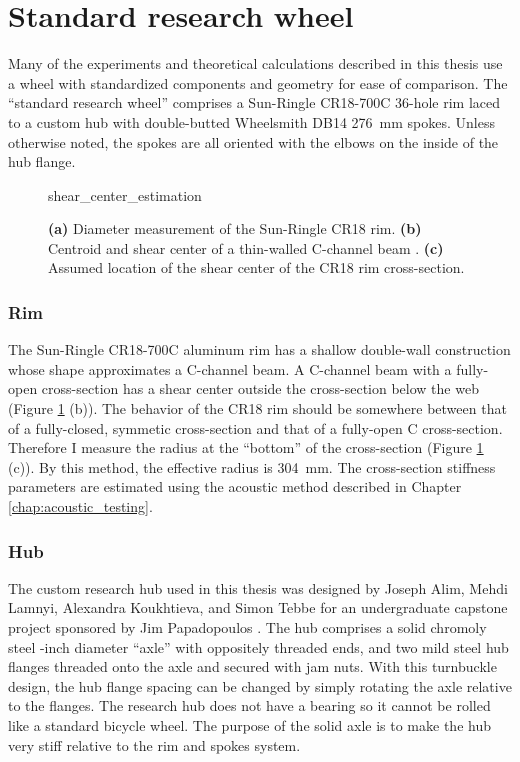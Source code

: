 \documentclass[../../thesis.tex]{subfiles}
\begin{document}
\section{Standard research wheel}
\label{app:std_research_wheel}
Many of the experiments and theoretical calculations described in this thesis use a wheel with standardized components and geometry for ease of comparison. The ``standard research wheel'' comprises a Sun-Ringle CR18-700C 36-hole rim laced to a custom hub with double-butted Wheelsmith DB14 \SI{276}{mm} spokes. Unless otherwise noted, the spokes are all oriented with the elbows on the inside of the hub flange.

\begin{figure}[h]
\centering
{shear_center_estimation}
\caption{\textbf{(a)} Diameter measurement of the Sun-Ringle CR18 rim. \textbf{(b)} Centroid and shear center of a thin-walled C-channel beam \cite{Timoshenko1961}. \textbf{(c)} Assumed location of the shear center of the CR18 rim cross-section.}
\label{fig:shear_center_estimation}
\end{figure}

\subsubsection*{Rim}

The Sun-Ringle CR18-700C aluminum rim has a shallow double-wall construction whose shape approximates a C-channel beam. A C-channel beam with a fully-open cross-section has a shear center outside the cross-section below the web \cite{Timoshenko1961} (Figure \ref{fig:shear_center_estimation} (b)). The behavior of the CR18 rim should be somewhere between that of a fully-closed, symmetic cross-section and that of a fully-open C cross-section. Therefore I measure the radius at the ``bottom'' of the cross-section (Figure \ref{fig:shear_center_estimation} (c)). By this method, the effective radius is \SI{304}{mm}. The cross-section stiffness parameters are estimated using the acoustic method described in Chapter \ref{chap:acoustic_testing}.

\subsubsection*{Hub}
The custom research hub used in this thesis was designed by Joseph Alim, Mehdi Lamnyi, Alexandra Koukhtieva, and Simon Tebbe for an undergraduate capstone project sponsored by Jim Papadopoulos \cite{Alim2016}. The hub comprises a solid chromoly steel -inch diameter ``axle'' with oppositely threaded ends, and two mild steel hub flanges threaded onto the axle and secured with jam nuts. With this turnbuckle design, the hub flange spacing can be changed by simply rotating the axle relative to the flanges. The research hub does not have a bearing so it cannot be rolled like a standard bicycle wheel. The purpose of the solid axle is to make the hub very stiff relative to the rim and spokes system.
\end{document}
